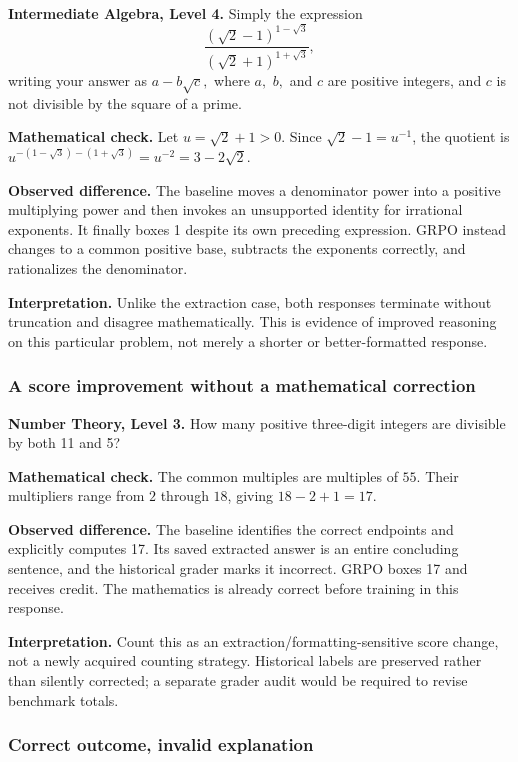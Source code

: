 \textbf{Intermediate Algebra, Level 4.} Simply the expression
\[\frac{(\sqrt{2} - 1)^{1 - \sqrt{3}}}{(\sqrt{2} + 1)^{1 + \sqrt{3}}},\]writing your answer as $a - b \sqrt{c},$ where $a,$ $b,$ and $c$ are positive integers, and $c$ is not divisible by the square of a prime.

\textbf{Mathematical check.} Let $u=\sqrt{2}+1>0$. Since $\sqrt{2}-1=u^{-1}$, the quotient is $u^{-(1-\sqrt{3})-(1+\sqrt{3})}=u^{-2}=3-2\sqrt{2}$.

\textbf{Observed difference.} The baseline moves a denominator power into a positive multiplying power and then invokes an unsupported identity for irrational exponents. It finally boxes 1 despite its own preceding expression. GRPO instead changes to a common positive base, subtracts the exponents correctly, and rationalizes the denominator.

\textbf{Interpretation.} Unlike the extraction case, both responses terminate without truncation and disagree mathematically. This is evidence of improved reasoning on this particular problem, not merely a shorter or better-formatted response.

\subsubsection*{A score improvement without a mathematical correction}

\textbf{Number Theory, Level 3.} How many positive three-digit integers are divisible by both 11 and 5?

\textbf{Mathematical check.} The common multiples are multiples of $55$. Their multipliers range from $2$ through $18$, giving $18-2+1=17$.

\textbf{Observed difference.} The baseline identifies the correct endpoints and explicitly computes 17. Its saved extracted answer is an entire concluding sentence, and the historical grader marks it incorrect. GRPO boxes 17 and receives credit. The mathematics is already correct before training in this response.

\textbf{Interpretation.} Count this as an extraction/formatting-sensitive score change, not a newly acquired counting strategy. Historical labels are preserved rather than silently corrected; a separate grader audit would be required to revise benchmark totals.

\subsubsection*{Correct outcome, invalid explanation}


